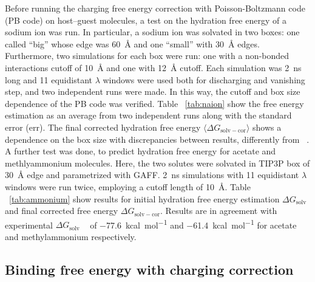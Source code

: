 \documentclass[11pt,oneside,a4paper]{article}
\begin{document}
Before running the charging free energy correction with Poisson-Boltzmann code (PB code) on host--guest molecules, a test on the hydration free energy of a sodium ion was run. In particular, a sodium ion was solvated in two boxes: one called ``big'' whose edge was \SI{60}{\AA}  and one ``small'' with \SI{30}{\AA}  edges. Furthermore, two simulations for each box were run: one with a non-bonded interactions cutoff of \SI{10}{\AA}  and one with \SI{12}{\AA}  cutoff. Each simulation was \SI{2}{ns} long and 11 equidistant $\lambda$ windows were used both for discharging and vanishing step, and two independent runs were made. In this way, the cutoff and box size dependence of the PB code was verified. Table ~\ref{tab:naion} show the free energy estimation as an average from two independent runs along with the standard error (err). The final corrected hydration free energy $\langle \Delta G_\mathrm{solv-cor} \rangle$ shows a dependence on the box size with discrepancies between results, differently from ~\cite{Kastenholz1,Kastenholz2}.
A further test was done, to predict hydration free energy for acetate and methlyammonium molecules. Here, the two solutes were solvated in TIP3P box of \SI{30}{\AA} edge and parametrized with GAFF. \SI{2}{ns} simulations with 11 equidistant $\lambda$ windows were run twice, employing a cutoff length of \SI{10}{\AA}. Table ~\ref{tab:ammonium} show results for initial hydration free energy estimation  $\Delta G_\mathrm{solv}$ and final corrected free energy  $\Delta G_\mathrm{solv-cor}$. Results are in agreement with experimental $\Delta G_\mathrm{solv}$ ~\cite{marenich2009minnesota} of \SI{-77.6}{kcal mol^{-1}} and \SI{-61.4}{kcal mol^{-1}} for acetate and methylammonium respectively.



\subsection{Binding free energy with charging correction}
\label{sec:bindingcharging}
\end{document}
